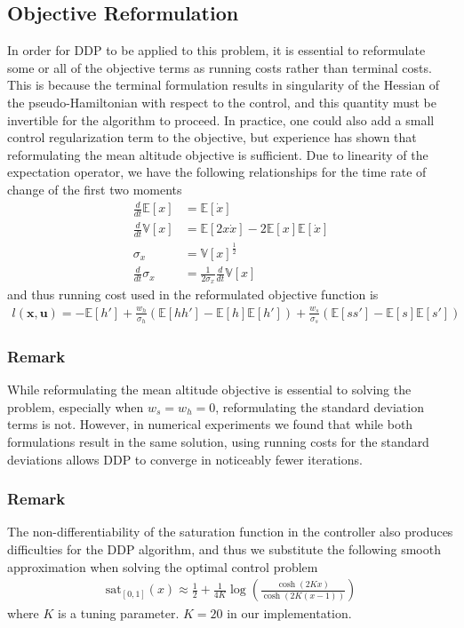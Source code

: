 \documentclass[journal ]{new-aiaa}
\newcommand{\state}{\ensuremath{\mathbf{x}}}
\newcommand{\control}{\ensuremath{\mathbf{u}}}
\newcommand{\E}[1]{\mathbb{E}\left[#1\right]}
\newcommand{\V}[1]{\mathbb{V}[#1]}
\begin{document}
\subsection*{Objective Reformulation}
In order for DDP to be applied to this problem, it is essential to reformulate some or all of the objective terms as running costs rather than terminal costs. This is because the terminal formulation results in singularity of the Hessian of the pseudo-Hamiltonian with respect to the control, and this quantity must be invertible for the algorithm to proceed. In practice, one could also add a small control regularization term to the objective, but experience has shown that reformulating the mean altitude objective is sufficient. Due to linearity of the expectation operator, we have the following relationships for the time rate of change of the first two moments
\begin{align}
\frac{d }{d t}\E{x} &= \E{\dot{x}} \\
\frac{d }{d t}\V{x} &= \E{2x\dot{x}} - 2\E{x}\E{\dot{x}} \\
\sigma_x &= \V{x}^{\frac{1}{2}} \\
\frac{d }{d t}\sigma_x &= \frac{1}{2\sigma_x}\frac{d }{d t}\V{x}
\end{align}
and thus running cost used in the reformulated objective function is 
\begin{align}
l(\state,\control) = -\E{h'} +  \frac{w_h}{\sigma_h}(\E{hh'}-\E{h}\E{h'}) + \frac{w_s}{\sigma_s}(\E{ss'}-\E{s}\E{s'})
\end{align}

\subsubsection*{Remark} While reformulating the mean altitude objective is essential to solving the problem, especially when $w_s=w_h=0$, reformulating the standard deviation terms is not. However, in numerical experiments we found that while both formulations result in the same solution, using running costs for the standard deviations allows DDP to converge in noticeably fewer iterations.

\subsubsection*{Remark} The non-differentiability of the saturation function in the controller also produces difficulties for the DDP algorithm, and thus we substitute the following smooth approximation when solving the optimal control problem
\begin{align*}
\mathrm{sat}_{[0,1]}(x) \approx \frac{1}{2} + \frac{1}{4K}\log\left(\frac{\cosh (2Kx)}{\cosh (2K(x-1))}\right) 
\end{align*}
where $K$ is a tuning parameter. $K=20$ in our implementation.
\end{document}
